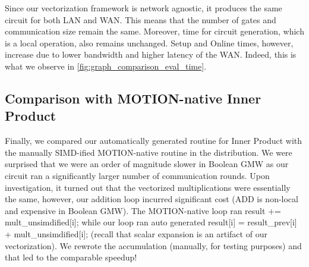 Since our vectorization framework is network agnostic, it produces the same circuit for both LAN and WAN. This means that the number of gates and communication size remain the same. Moreover, time for circuit generation, which is a local operation, also remains unchanged. Setup and Online times, however, increase due to lower bandwidth and higher latency of the WAN. Indeed, this is what we observe in \cref{fig:graph_comparison_eval_time}.

\begin{comment}
\begin{figure*}[htbp]
\centering
\resizebox{0.7\textwidth}{!}{}
\caption{Communication Size of Benchmarks}
\label{fig:graph_comm_size}
\end{figure*}


\begin{figure*}[htbp]
\centering
\resizebox{0.7\textwidth}{!}{}
\caption{Circuit Generation Time of Benchmarks}
\label{fig:graph_circ_gen_time}
\end{figure*}

\begin{figure*}[htbp]
\centering
\resizebox{0.7\textwidth}{!}{}
\caption{Number of Gates of Benchmarks}
\label{fig:graph_total_gates}
\end{figure*}

\begin{figure*}[htbp]
\centering
\resizebox{0.7\textwidth}{!}{}
\caption{Online Time of Benchmarks}
\label{fig:graph_online_time}
\end{figure*}

\begin{figure*}[htbp]
\centering
\resizebox{0.7\textwidth}{!}{}
\caption{Setup Time of Benchmarks}
\label{fig:graph_setup_time}
\end{figure*}
\end{comment}

\subsection{Comparison with MOTION-native Inner Product}

Finally, we compared our automatically generated routine for Inner Product with the manually SIMD-ified MOTION-native routine in the distribution. 
We were surprised that we were an order of magnitude slower in Boolean GMW as our circuit ran a significantly larger 
number of communication rounds. Upon investigation, it turned out that the vectorized multiplications were essentially the same, 
however, our addition loop incurred significant cost (ADD is non-local and expensive in Boolean GMW). The MOTION-native loop ran 
{\sf result += mult\_unsimdified[i];} while our loop ran auto generated {\sf result[i] = result\_prev[i] + mult\_unsimdified[i];} (recall that scalar expansion
is an artifact of our vectorization). We rewrote the accumulation (manually, for testing purposes) and that led to the comparable speedup!

